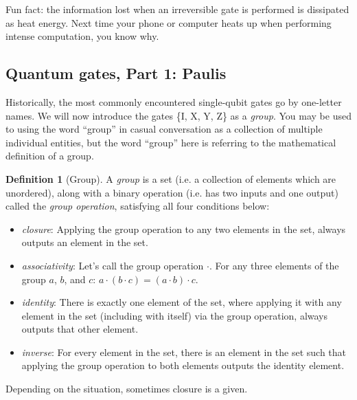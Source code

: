 \documentclass{article}
\theoremstyle{definition}
\newtheorem{definition}{Definition}
\begin{document}
Fun fact: the information lost when an irreversible gate is performed is dissipated as heat energy.  Next time your phone or computer heats up when performing intense computation, you know why.

\subsection{Quantum gates, Part 1: Paulis}
Historically, the most commonly encountered single-qubit gates go by one-letter names.
We will now introduce the gates \{I, X, Y, Z\} as a \textit{group}.
You may be used to using the word ``group'' in casual conversation as a collection of multiple individual entities, but the word ``group'' here is referring to the mathematical definition of a group.

\begin{definition}[Group]
	A \textit{group} is a set (i.e. a collection of elements which are unordered), along with a binary operation (i.e. has two inputs and one output) called the \textit{group operation}, satisfying all four conditions below:
	\begin{itemize}
		\item \textit{closure}: Applying the group operation to any two elements in the set, always outputs an element in the set.
		\item \textit{associativity}: Let's call the group operation $\cdot$.  For any three elements of the group $a$, $b$, and $c$: $a \cdot (b \cdot c) = (a \cdot b) \cdot c$.
		\item \textit{identity}: There is exactly one element of the set, where applying it with any element in the set (including with itself) via the group operation, always outputs that other element.
		\item \textit{inverse}: For every element in the set, there is an element in the set such that applying the group operation to both elements outputs the identity element.
	\end{itemize}
\end{definition}
Depending on the situation, sometimes closure is a given.
\end{document}
